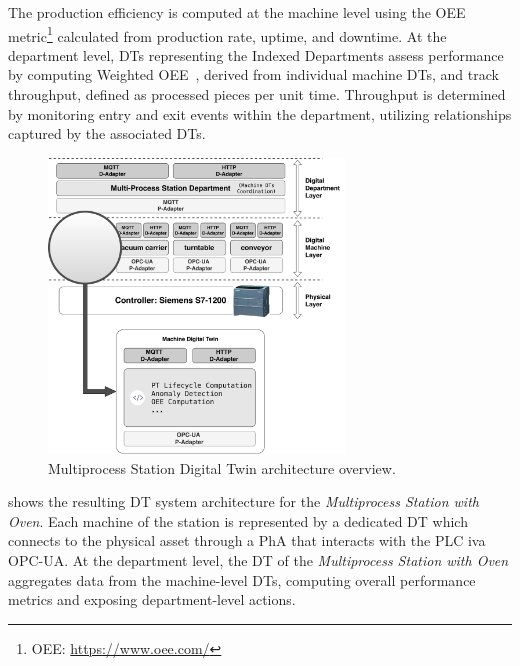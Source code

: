 The production efficiency is computed at the machine level using the \ac{OEE} metric\footnote{OEE: \url{https://www.oee.com/}} calculated from production rate, uptime, and downtime.
%
At the department level, \acp{DT} representing the Indexed Departments assess performance by computing Weighted \ac{OEE}~\cite{OEE-manufacturing-cell-Gamberini-2017,Introduction-to-TPM-total-productive-maintenance-Nakajima-1995}, derived from individual machine \acp{DT}, and track throughput, defined as processed pieces per unit time.
Throughput is determined by monitoring entry and exit events within the department, utilizing relationships captured by the associated \acp{DT}.

\begin{figure}
    \centering
    \includegraphics[width=0.7\textwidth]{figures/dt-lifecycle/mps_dt_structure_2.pdf}
    \caption{Multiprocess Station Digital Twin architecture overview.}
    \label{fig:multiprocess-station-dt-structure}
\end{figure}

 shows the resulting \ac{DT} system architecture for the \textit{Multiprocess Station with Oven}.
%
Each machine of the station is represented by a dedicated \ac{DT} which connects to the physical asset through a \ac{PhA} that interacts with the PLC iva OPC-UA.
%
At the department level, the \ac{DT} of the \textit{Multiprocess Station with Oven} aggregates data from the machine-level \acp{DT}, computing overall performance metrics and exposing department-level actions.

